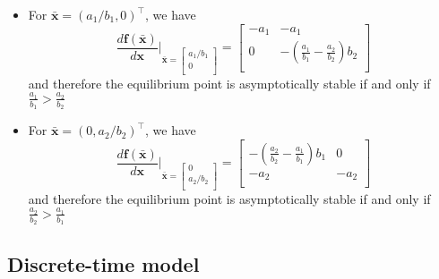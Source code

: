 \documentclass[12pt,a4paper]{article}
\begin{document}
\begin{itemize}
\begin{itemize}
  \item For $\bar{\bm{x}}=(a_{1}/b_{1}, 0)^{\top}$, we have
    \begin{equation}\nonumber%
      \frac{d\bm{f}(\bar{\bm{x}})}{d\bm{x}}\bigg|_{
        \bar{\bm{x}}=
        \begin{bmatrix}
          a_{1}/b_{1} \\
          0 \\
        \end{bmatrix}
      }
      =
      \begin{bmatrix}
        - a_{1} & -a_{1} \\
        0 & -\left(\frac{a_{1}}{b_{1}}-\frac{a_{2}}{b_{2}}\right)b_{2} \\
      \end{bmatrix}
    \end{equation}
    and therefore
    the equilibrium point is asymptotically stable if and only if $\frac{a_{1}}{b_{1}} > \frac{a_{2}}{b_{2}}$
    
  \item For $\bar{\bm{x}}=(0, a_{2}/b_{2})^{\top}$, we have
    \begin{equation}\nonumber%
      \frac{d\bm{f}(\bar{\bm{x}})}{d\bm{x}}\bigg|_{
        \bar{\bm{x}}=
        \begin{bmatrix}
          0 \\
          a_{2}/b_{2} \\
        \end{bmatrix}
      }
      =
      \begin{bmatrix}
        -\left(\frac{a_{2}}{b_{2}}-\frac{a_{1}}{b_{1}}\right)b_{1} & 0 \\
        -a_{2} & - a_{2} \\
      \end{bmatrix}
    \end{equation}
    and therefore
    the equilibrium point is asymptotically stable if and only if $\frac{a_{2}}{b_{2}} > \frac{a_{1}}{b_{1}}$
    
  \end{itemize}

\end{itemize}

\subsection{Discrete-time model}
\end{document}
